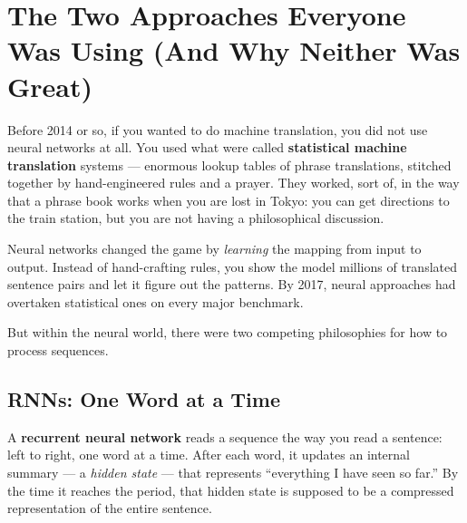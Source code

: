 \section{The Two Approaches Everyone Was Using (And Why Neither Was Great)}

Before 2014 or so, if you wanted to do machine translation, you did not use neural networks at all.
You used what were called \textbf{statistical machine translation} systems --- enormous lookup tables of phrase translations, stitched together by hand-engineered rules and a prayer.
They worked, sort of, in the way that a phrase book works when you are lost in Tokyo: you can get directions to the train station, but you are not having a philosophical discussion.

Neural networks changed the game by \emph{learning} the mapping from input to output.
Instead of hand-crafting rules, you show the model millions of translated sentence pairs and let it figure out the patterns.
By 2017, neural approaches had overtaken statistical ones on every major benchmark.

But within the neural world, there were two competing philosophies for how to process sequences.

\subsection{RNNs: One Word at a Time}

A \textbf{recurrent neural network} reads a sequence the way you read a sentence: left to right, one word at a time.
After each word, it updates an internal summary --- a \emph{hidden state} --- that represents ``everything I have seen so far.''
By the time it reaches the period, that hidden state is supposed to be a compressed representation of the entire sentence.

